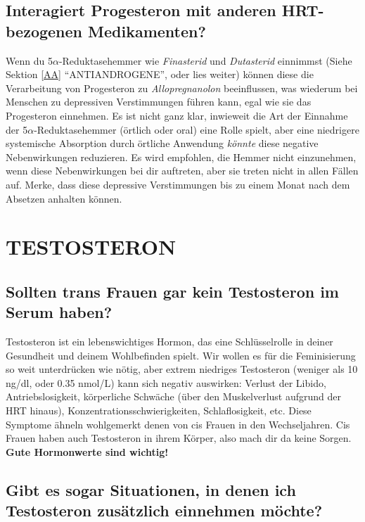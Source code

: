 \documentclass{article}
\begin{document}
\subsection{Interagiert Progesteron mit anderen HRT-bezogenen Medikamenten?}\label{8-18}

Wenn du 5$\alpha$-Reduktasehemmer wie \textit{Finasterid} und \textit{Dutasterid} einnimmst (Siehe Sektion \ref{AA} “ANTIANDROGENE”, oder lies weiter) können diese die Verarbeitung von Progesteron zu \textit{Allopregnanolon} beeinflussen, was wiederum bei Menschen zu depressiven Verstimmungen führen kann, egal wie sie das Progesteron einnehmen. Es ist nicht ganz klar, inwieweit die Art der Einnahme der 5$\alpha$-Reduktasehemmer (örtlich oder oral) eine Rolle spielt, aber eine niedrigere systemische Absorption durch örtliche Anwendung \textit{könnte }diese negative Nebenwirkungen reduzieren. Es wird empfohlen, die Hemmer nicht einzunehmen, wenn diese Nebenwirkungen bei dir auftreten, aber sie treten nicht in allen Fällen auf. Merke, dass diese depressive Verstimmungen bis zu einem Monat nach dem Absetzen anhalten können. 

\section{TESTOSTERON}\label{T}

\subsection{Sollten trans Frauen \textbf{gar kein} Testosteron im Serum haben?}

Testosteron ist ein lebenswichtiges Hormon, das eine Schlüsselrolle in deiner Gesundheit und deinem Wohlbefinden spielt. Wir wollen es für die Feminisierung so weit unterdrücken wie nötig, aber extrem niedriges Testosteron (weniger als 10 ng/dl, oder 0.35 nmol/L) kann sich negativ auswirken: Verlust der Libido, Antriebslosigkeit, körperliche Schwäche (über den Muskelverlust aufgrund der HRT hinaus), Konzentrationsschwierigkeiten, Schlaflosigkeit, etc. Diese Symptome ähneln wohlgemerkt denen von cis Frauen in den Wechseljahren. Cis Frauen haben auch Testosteron in ihrem Körper, also mach dir da keine Sorgen. \textbf{Gute Hormonwerte sind wichtig!}

\subsection{Gibt es sogar Situationen, in denen ich Testosteron zusätzlich einnehmen möchte?}\label{9-2}
\end{document}
